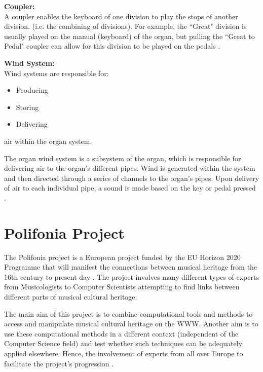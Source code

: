 \noindent \textbf{Coupler:}
\\ \hspace*{0.5cm} A coupler enables the keyboard of one division to play the stops of another division. (i.e. the combining of divisions). For example, the ``Great" division is usually played on the manual (keyboard) of the organ, but pulling the ``Great to Pedal" coupler can allow for this division to be played on the pedals \cite{organvideo}.

\noindent \textbf{Wind System:}
\\ Wind systems are responsible for:

\vspace{-0.15cm}
\begin{itemize}
    \itemsep0em 
\item Producing
\vspace{-0.1cm}
\item Storing
\vspace{-0.1cm}
\item Delivering
\end{itemize}
\vspace{-0.15cm}

\noindent air within the organ system.

The organ wind system is a subsystem of the organ, which is responsible for delivering air to the organ's different pipes. Wind is generated within the system and then directed through a series of channels to the organ's pipes. Upon delivery of air to each individual pipe, a sound is made based on the key or pedal pressed \cite{organvideo}.

\section{Polifonia Project}
\hspace{0.5cm} The Polifonia project is a European project funded by the EU Horizon 2020 Programme that will manifest the connections between musical heritage from the 16th century to present day \cite{polifonia}. The project involves many different types of experts from Musicologists to Computer Scientists attempting to find links between different parts of musical cultural heritage. 

The main aim of this project is to combine computational tools and methods to access and manipulate musical cultural heritage on the WWW. Another aim is to use these computational methods in a different context (independent of the Computer Science field) and test whether such techniques can be adequately applied elsewhere. Hence, the involvement of experts from all over Europe to facilitate the project's progression \cite{polifoniaproject}.

